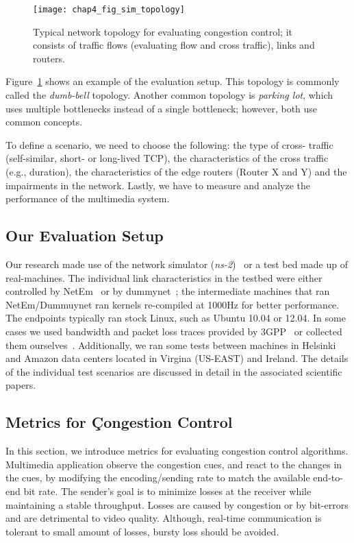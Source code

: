 \begin{figure}
\texttt{[image: chap4\_fig\_sim\_topology]}
\caption{Typical network topology for evaluating congestion control; it
consists of traffic flows (evaluating flow and cross traffic), links and
routers.} 
\label{fig:4:topology}
\end{figure}


Figure~\ref{fig:4:topology} shows an example of the evaluation setup. This
topology is commonly called the \emph{dumb-bell} topology. Another common
topology is \emph{parking lot}, which uses multiple bottlenecks instead of a
single bottleneck; however, both use common concepts.


To define a scenario, we need to choose the following: the type of cross-
traffic (self-similar, short- or long-lived TCP), the characteristics of the
cross traffic (e.g., duration), the characteristics of the edge routers
(Router X and Y) and the impairments in the network. Lastly, we have to
measure and analyze the performance of the multimedia system.


\subsection{Our Evaluation Setup}

Our research made use of the network simulator (\emph{ns-2})~\cite{ns2} or a
test bed made up of real-machines. The individual link characteristics in the
testbed were either controlled by NetEm~\cite{netem} or by
dummynet~\cite{Carbone:2010p3502}; the intermediate machines that ran
NetEm/Dummuynet ran kernels re-compiled at 1000Hz for better performance. The
endpoints typically ran stock Linux, such as Ubuntu 10.04 or 12.04. In some
cases we used bandwidth and packet loss traces provided by
3GPP~\cite{s4.eval.bitrate} or collected them ourselves~\cite{sharmistha-thesis}. 
Additionally, we ran some tests between machines in Helsinki and
Amazon data centers located in Virgina (US-EAST) and Ireland. The details of the
individual test scenarios are discussed in detail in the associated scientific 
papers.

\subsection{Metrics for Çongestion Control}
\label{subsec.metrics}

In this section, we introduce metrics for evaluating congestion control
algorithms. Multimedia application observe the congestion cues, and react to
the changes in the cues, by modifying the encoding/sending rate to match the
available end-to-end bit rate. The sender's goal is to minimize losses at the
receiver while maintaining a stable throughput. Losses are caused by
congestion or by  bit-errors and are detrimental to video quality. Although,
real-time communication is tolerant to small amount of losses, bursty loss
should be avoided.  

